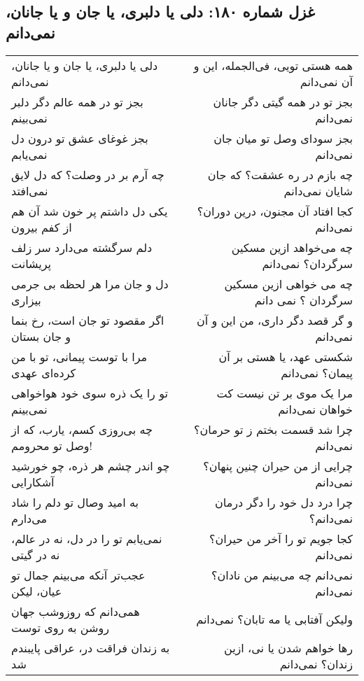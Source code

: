 \begin{center}
\section*{غزل شماره ۱۸۰: دلی یا دلبری، یا جان و یا جانان، نمی‌دانم}
\label{sec:180}
\begin{longtable}{l p{0.5cm} r}
دلی یا دلبری، یا جان و یا جانان، نمی‌دانم
&&
همه هستی تویی، فی‌الجمله، این و آن نمی‌دانم
\\
بجز تو در همه عالم دگر دلبر نمی‌بینم
&&
بجز تو در همه گیتی دگر جانان نمی‌دانم
\\
بجز غوغای عشق تو درون دل نمی‌یابم
&&
بجز سودای وصل تو میان جان نمی‌دانم
\\
چه آرم بر در وصلت؟ که دل لایق نمی‌افتد
&&
چه بازم در ره عشقت؟ که جان شایان نمی‌دانم
\\
یکی دل داشتم پر خون شد آن هم از کفم بیرون
&&
کجا افتاد آن مجنون، درین دوران؟ نمی‌دانم
\\
دلم سرگشته می‌دارد سر زلف پریشانت
&&
چه می‌خواهد ازین مسکین سرگردان؟ نمی‌دانم
\\
دل و جان مرا هر لحظه بی جرمی بیزاری
&&
چه می خواهی ازین مسکین سرگردان ؟ نمی دانم
\\
اگر مقصود تو جان است، رخ بنما و جان بستان
&&
و گر قصد دگر داری، من این و آن نمی‌دانم
\\
مرا با توست پیمانی، تو با من کرده‌ای عهدی
&&
شکستی عهد، یا هستی بر آن پیمان؟ نمی‌دانم
\\
تو را یک ذره سوی خود هواخواهی نمی‌بینم
&&
مرا یک موی بر تن نیست کت خواهان نمی‌دانم
\\
چه بی‌روزی کسم، یارب، که از وصل تو محرومم!
&&
چرا شد قسمت بختم ز تو حرمان؟ نمی‌دانم
\\
چو اندر چشم هر ذره، چو خورشید آشکارایی
&&
چرایی از من حیران چنین پنهان؟ نمی‌دانم
\\
به امید وصال تو دلم را شاد می‌دارم
&&
چرا درد دل خود را دگر درمان نمی‌دانم؟
\\
نمی‌یابم تو را در دل، نه در عالم، نه در گیتی
&&
کجا جویم تو را آخر من حیران؟ نمی‌دانم
\\
عجب‌تر آنکه می‌بینم جمال تو عیان، لیکن
&&
نمی‌دانم چه می‌بینم من نادان؟ نمی‌دانم
\\
همی‌دانم که روزوشب جهان روشن به روی توست
&&
ولیکن آفتابی یا مه تابان؟ نمی‌دانم
\\
به زندان فراقت در، عراقی پایبندم شد
&&
رها خواهم شدن یا نی، ازین زندان؟ نمی‌دانم
\\
\end{longtable}
\end{center}
